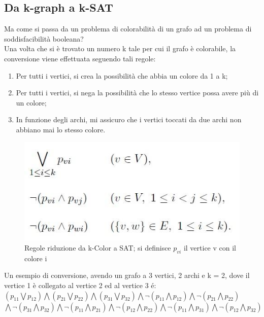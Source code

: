 \documentclass[a4paper,11pt]{article} %
\begin{document}
\subsection{Da k-graph a k-SAT}
Ma come si passa da un problema di colorabilità di un grafo ad un problema di soddisfacibilità booleana?\\
Una volta che si è trovato un numero k tale per cui il grafo è colorabile, la conversione viene effettuata seguendo tali regole:
\begin{enumerate}
	\item Per tutti i vertici, si crea la possibilità che abbia un colore da 1 a k;
	\item Per tutti i vertici, si nega la possibilità che lo stesso vertice possa avere più di un colore;
	\item In funzione degli archi, mi assicuro che i vertici toccati da due archi non abbiano mai lo stesso colore.
\end{enumerate}
\begin{figure}[h]
	\centering
    \includegraphics[scale=0.5]{kcolor_to_sat.jpg}
    \caption{Regole riduzione da k-Color a SAT; si definisce $p_{vi}$ il vertice v con il colore i }
\end{figure}
Un esempio di conversione, avendo un grafo a 3 vertici, 2 archi e k = 2, dove il vertice 1 è collegato al vertice 2 ed al vertice 3 é: \newline
$(p_{11} \bigvee p_{12}) \bigwedge (p_{21} \bigvee p_{22}) \bigwedge (p_{31} \bigvee p_{32}) \bigwedge \lnot(p_{11} \bigwedge p_{12}) \bigwedge \lnot(p_{21} \bigwedge p_{22}) $ \\ $ \bigwedge \lnot(p_{31} \bigwedge p_{32}) \bigwedge \lnot(p_{11} \bigwedge p_{21}) \bigwedge \lnot(p_{12} \bigwedge p_{22}) \bigwedge \lnot(p_{11} \bigwedge p_{31}) \bigwedge \lnot(p_{12} \bigwedge p_{32})$
\pagebreak
\end{document}
